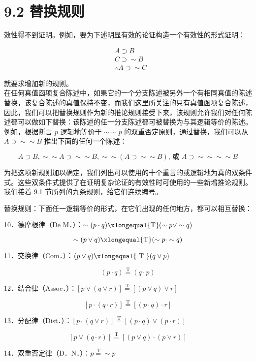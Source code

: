 \section*{9.2 替换规则}
效性得不到证明。例如，要为下述明显有效的论证构造一个有效性的形式证明：

$$
\begin{aligned}
& A \supset B \\
& C \supset \sim B \\
& \therefore A \supset \sim C
\end{aligned}
$$

就要求增加新的规则。\\
在任何真值函项复合陈述中，如果它的一个分支陈述被另外一个有相同真值的陈述替换，该复合陈述的真值保持不变，而我们这里所关注的只有真值函项复合陈述，因此，我们可以把替换规则作为新的推论规则接受下来，该规则允许我们对任何陈述都可以做如下替换：该陈述的任一分支陈述都可被替换为与其逻辑等价的陈述。例如，根据断言 $p$ 逻辑地等价于 $\sim \sim p$ 的双重否定原则，通过替换，我们可以从 $A \supset \sim \sim B$ 推出下面的任何一个陈述：

$$
A \supset B, \sim \sim A \supset \sim \sim B, \sim \sim(A \supset \sim \sim B) \text {, 或 } A \supset \sim \sim \sim \sim B
$$

为把这项新规则加以确定，我们列出可以使用的十个重言的或逻辑地为真的双条件式。这些双条件式提供了在证明复杂论证的有效性时可使用的一些新增推论规则。我们接着 9.1 节所列的九条规则，给它们连续编号。

替换规则：下面任一逻辑等价的形式，在它们出现的任何地方，都可以相互替换：

10．德摩根律（De M．）：$\sim(p \cdot q) \xlongequal{\mathrm{T}}(\sim p \vee \sim q)$

$$
\sim(p \vee q) \xlongequal{\mathrm{T}}(\sim p \cdot \sim q)
$$

11．交换律（Com．）：$(p \vee q) \xlongequal{\text { T }}(q \vee p)$

$$
(p \cdot q) \stackrel{\mathrm{T}}{=}(q \cdot p)
$$

12．结合律（Assoc．）：$[p \vee(q \vee r)] \stackrel{\mathrm{T}}{=}[(p \vee q) \vee r]$

$$
[p \cdot(q \cdot r)] \stackrel{\mathrm{T}}{=}[(p \cdot q) \cdot r]
$$

13．分配律（Dist．）：$[p \cdot(q \vee r)] \stackrel{\mathrm{T}}{=}[(p \cdot q) \vee(p \cdot r)]$

$$
[p \vee(q \cdot r)] \stackrel{\mathrm{T}}{=}[(p \vee q) \cdot(p \vee r)]
$$

14．双重否定律（D．N．）：$p \stackrel{\mathrm{~T}}{=} \sim p$

